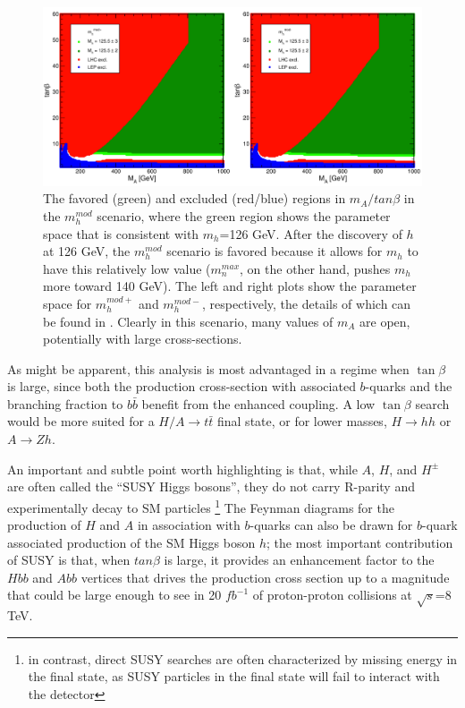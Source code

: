 \begin{figure}
	\centering
	\includegraphics[width=\textwidth]{Theory/figures/mh_mod.pdf}
	\caption{The favored (green) and excluded (red/blue) regions in 
    $m_A/tan\beta$ in the $m_h^{mod}$ scenario, where the green 
    region shows the parameter space that is consistent with $m_h$=126 GeV.  
    After the discovery of $h$ at 126 GeV, the $m_h^{mod}$ 
    scenario is favored because it allows for $m_h$ to have 
    this relatively low value ($m_n^{max}$, on the other 
    hand, pushes $m_h$ more toward 140 GeV).  The 
    left and right plots show the parameter space for $m_h^{mod+}$ 
    and $m_h^{mod-}$, respectively, the details of which 
    can be found in \cite{Carena-2}. Clearly in this 
    scenario, many values of $m_A$ are open, potentially with large cross-sections. \label{fig:mh_mod}}
\end{figure}



As might be apparent, this analysis is 
most advantaged in a regime when $\tan\beta$ is large, since both
the production cross-section with associated $b$-quarks and the
branching fraction to $b\bar{b}$ benefit from the enhanced coupling.
A low $\tan\beta$ search would be more suited for a $H/A\rightarrow t\bar{t}$
final state, or for lower masses, $H\rightarrow hh$ or $A\rightarrow Zh$.


An important and subtle point worth highlighting is that, while 
$A$, $H$, and $H^\pm$ are often called the ``SUSY Higgs bosons'', 
they do not carry R-parity and experimentally decay to SM particles
\footnote{in contrast, direct SUSY searches are often characterized
by missing energy in the final state, as SUSY particles in the 
final state will fail to interact with the detector}
The Feynman diagrams for the production of $H$ and $A$ 
in association with $b$-quarks can also be drawn for 
$b$-quark associated production of the SM Higgs boson $h$; 
the most important contribution of SUSY is that, when $tan\beta$ 
is large, it provides an enhancement factor to the $Hbb$ and $Abb$ vertices that 
drives the production cross section up to a magnitude that could be 
large enough to see in 20 $fb^{-1}$ of proton-proton collisions at $\sqrt{s}$=8 TeV.

